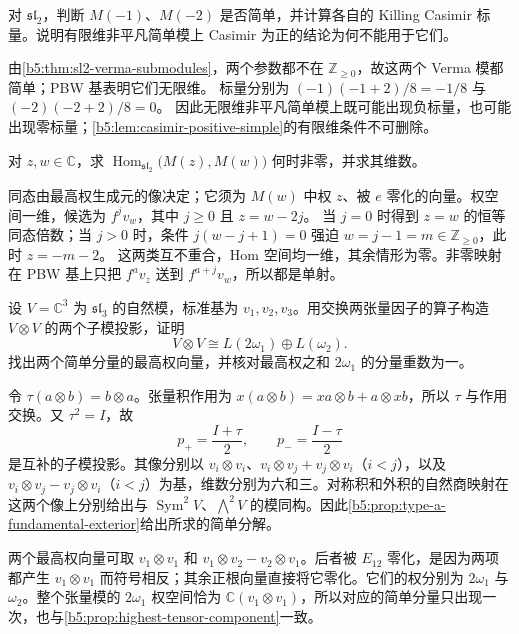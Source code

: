 \begin{exercise}\label{b5:ex:18-nonintegral-verma}
	对 \(\mathfrak{sl}_2\)，判断 \(M(-1)\)、\(M(-2)\) 是否简单，并计算各自的 Killing Casimir 标量。说明有限维非平凡简单模上 Casimir 为正的结论为何不能用于它们。
\end{exercise}
\begin{solution}
	由\cref{b5:thm:sl2-verma-submodules}，两个参数都不在 \(\mathbb Z_{\ge0}\)，故这两个 Verma 模都简单；PBW 基表明它们无限维。 标量分别为 \((-1)(-1+2)/8=-1/8\) 与 \((-2)(-2+2)/8=0\)。 因此无限维非平凡简单模上既可能出现负标量，也可能出现零标量；\cref{b5:lem:casimir-positive-simple}的有限维条件不可删除。
\end{solution}

\begin{exercise}\label{b5:ex:18-verma-hom-sl2}
	对 \(z,w\in\mathbb C\)，求 \(\operatorname{Hom}_{\mathfrak{sl}_2}\bigl(M(z),M(w)\bigr)\) 何时非零，并求其维数。
\end{exercise}
\begin{solution}
	同态由最高权生成元的像决定；它须为 \(M(w)\) 中权 \(z\)、被 \(e\) 零化的向量。权空间一维，候选为 \(f^jv_w\)，其中 \(j\ge0\) 且 \(z=w-2j\)。 当 \(j=0\) 时得到 \(z=w\) 的恒等同态倍数；当 \(j>0\) 时，条件 \(j(w-j+1)=0\) 强迫 \(w=j-1=m\in\mathbb Z_{\ge0}\)，此时 \(z=-m-2\)。 这两类互不重合，Hom 空间均一维，其余情形为零。非零映射在 PBW 基上只把 \(f^av_z\) 送到 \(f^{a+j}v_w\)，所以都是单射。
\end{solution}

\begin{exercise}\label{b5:ex:18-highest-sum-tensor}
	设 \(V=\mathbb C^3\) 为 \(\mathfrak{sl}_3\) 的自然模，标准基为 \(v_1,v_2,v_3\)。用交换两张量因子的算子构造 \(V\otimes V\) 的两个子模投影，证明
	\[
		V\otimes V\cong L(2\omega_1)\oplus L(\omega_2).
	\]
	找出两个简单分量的最高权向量，并核对最高权之和 \(2\omega_1\) 的分量重数为一。
\end{exercise}
\begin{solution}
	令 \(\tau(a\otimes b)=b\otimes a\)。张量积作用为 \(x(a\otimes b)=xa\otimes b+a\otimes xb\)，所以 \(\tau\) 与作用交换。又 \(\tau^2=I\)，故
	\[
		p_+=\frac{I+\tau}{2},\qquad p_-=\frac{I-\tau}{2}
	\]
	是互补的子模投影。其像分别以 \(v_i\otimes v_i\)、\(v_i\otimes v_j+v_j\otimes v_i\)（\(i<j\)），以及 \(v_i\otimes v_j-v_j\otimes v_i\)（\(i<j\)）为基，维数分别为六和三。对称积和外积的自然商映射在这两个像上分别给出与 \(\operatorname{Sym}^2V\)、\(\bigwedge^2V\) 的模同构。因此\cref{b5:prop:type-a-fundamental-exterior}给出所求的简单分解。

	两个最高权向量可取 \(v_1\otimes v_1\) 和 \(v_1\otimes v_2-v_2\otimes v_1\)。后者被 \(E_{12}\) 零化，是因为两项都产生 \(v_1\otimes v_1\) 而符号相反；其余正根向量直接将它零化。它们的权分别为 \(2\omega_1\) 与 \(\omega_2\)。整个张量模的 \(2\omega_1\) 权空间恰为 \(\mathbb C(v_1\otimes v_1)\)，所以对应的简单分量只出现一次，也与\cref{b5:prop:highest-tensor-component}一致。
\end{solution}

